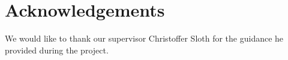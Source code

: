 \section*{Acknowledgements}

We would like to thank our supervisor Christoffer Sloth for the guidance he provided during the project.